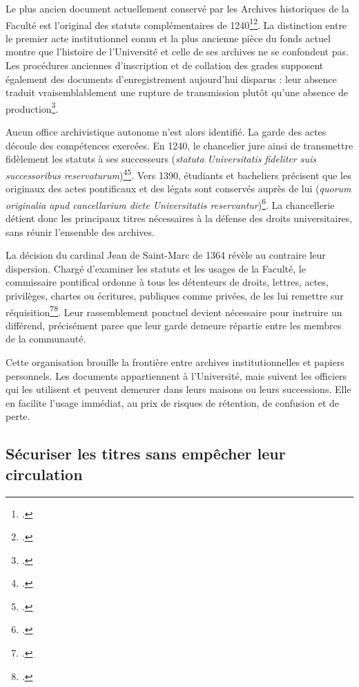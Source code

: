 Le plus ancien document actuellement conservé par les Archives historiques de la Faculté est l'original des statuts complémentaires de 1240\footcite{AHFMB1}\footcite{Statuts1240}. La distinction entre le premier acte institutionnel connu et la plus ancienne pièce du fonds actuel montre que l'histoire de l'Université et celle de ses archives ne se confondent pas. Les procédures anciennes d'inscription et de collation des grades supposent également des documents d'enregistrement aujourd'hui disparus : leur absence traduit vraisemblablement une rupture de transmission plutôt qu'une absence de production\footcite[p.~IX, vue~28 de la version numérisée]{CalmetteCartulaire1912}.

Aucun office archivistique autonome n'est alors identifié. La garde des actes découle des compétences exercées. En 1240, le chancelier jure ainsi de transmettre fidèlement les statuts à ses successeurs (\emph{statuta Universitatis fideliter suis successoribus reservaturum})\footcite{AHFMB1}\footcite{Statuts1240}. Vers 1390, étudiants et bacheliers précisent que les originaux des actes pontificaux et des légats sont conservés auprès de lui (\emph{quorum originalia apud cancellarium dicte Universitatis reservantur})\footcite{RequeteEtudiants1390}. La chancellerie détient donc les principaux titres nécessaires à la défense des droits universitaires, sans réunir l'ensemble des archives.

La décision du cardinal Jean de Saint-Marc de 1364 révèle au contraire leur dispersion. Chargé d'examiner les statuts et les usages de la Faculté, le commissaire pontifical ordonne à tous les détenteurs de droits, lettres, actes, privilèges, chartes ou écritures, publiques comme privées, de les lui remettre sur réquisition\footcite[fol.~8~v°, vues~15--16/194]{ADHG1277}\footcite{JeanSaintMarc1364}. Leur rassemblement ponctuel devient nécessaire pour instruire un différend, précisément parce que leur garde demeure répartie entre les membres de la communauté.

Cette organisation brouille la frontière entre archives institutionnelles et papiers personnels. Les documents appartiennent à l'Université, mais suivent les officiers qui les utilisent et peuvent demeurer dans leurs maisons ou leurs successions. Elle en facilite l'usage immédiat, au prix de risques de rétention, de confusion et de perte.

\subsection{Sécuriser les titres sans empêcher leur circulation}

